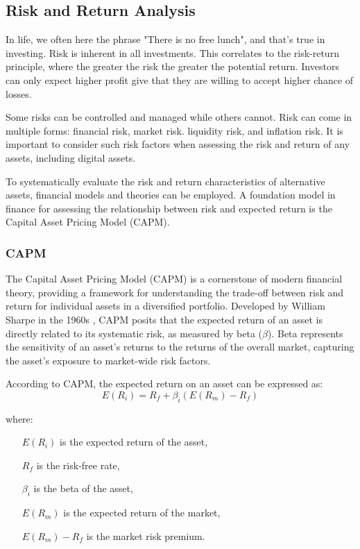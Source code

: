 \subsection{Risk and Return Analysis}

In life, we often here the phrase "There is no free lunch", and that's true in investing. Risk is inherent in all investments. This correlates to the risk-return principle, where the greater the risk the greater the potential return. Investors can only expect higher profit give that they are willing to accept higher chance of losses.

Some risks can be controlled and managed while others cannot. Risk can come in multiple forms: financial risk, market risk. liquidity risk, and inflation risk.  It is important to consider such risk factors when assessing the risk and return of any assets, including digital assets. 

To systematically evaluate the risk and return characteristics of alternative assets, financial models and theories can be employed. A foundation model in finance for assessing the relationship between risk and expected return is the Capital Asset Pricing Model (CAPM).

\subsubsection{CAPM}
The Capital Asset Pricing Model (CAPM) is a cornerstone of modern financial theory, providing a framework for understanding the trade-off between risk and return for individual assets in a diversified portfolio. Developed by William Sharpe in the 1960s \cite{Sharpe1964}, CAPM posits that the expected return of an asset is directly related to its systematic risk, as measured by beta (\(\beta\)). Beta represents the sensitivity of an asset's returns to the returns of the overall market, capturing the asset's exposure to market-wide risk factors.

According to CAPM, the expected return on an asset can be expressed as:
\[
E(R_i) = R_f + \beta_i (E(R_m) - R_f)
\]

where:
\begin{itemize}
    \item[$E(R_i)$] is the expected return of the asset,
    \item[$R_f$] is the risk-free rate,
    \item[$\beta_i$] is the beta of the asset,
    \item[$E(R_m)$] is the expected return of the market,
    \item[$E(R_m) - R_f$] is the market risk premium.
\end{itemize}

